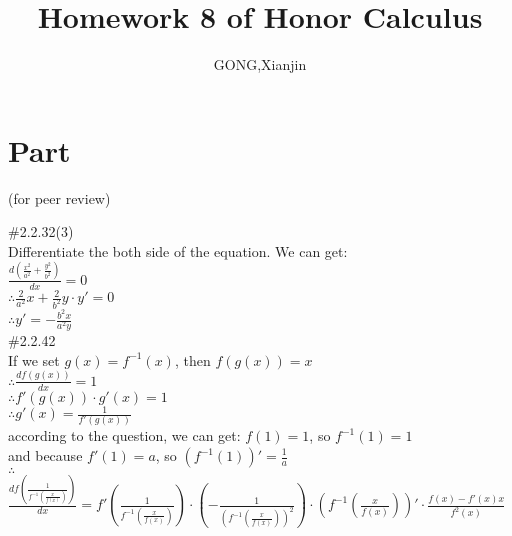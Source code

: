 \documentclass{article}
\author{GONG,Xianjin}
\title{Homework 8 of Honor Calculus}
\begin{document}
\maketitle

\section{\textcolor[rgb]{0.70,0.00,0.00}{Part \uppercase\expandafter{}}}(for peer review)

\vspace{3.5mm}

\textcolor[rgb]{0.00,0.00,0.50}{\#2.2.32(3)}\\

Differentiate the both side of the equation. We can get:\\

$\displaystyle\frac{d(\frac{x^2}{a^2}+\frac{y^2}{b^2})}{dx}=0$\\

$\therefore$\qquad$\displaystyle\frac{2}{a^2}x+\frac{2}{b^2}y\cdot y'=0$\\

$\therefore$\qquad$y'=-\frac{b^2x}{a^2y}$\\

\textcolor[rgb]{0.00,0.00,0.50}{\#2.2.42}\\

If we set $g(x)=f^{-1}(x)$, then $f(g(x))=x$\\

$\therefore$\qquad$\displaystyle\frac{df(g(x))}{dx}=1$\\

$\therefore$\qquad$f'(g(x))\cdot g'(x)=1$\\

$\therefore$\qquad$g'(x)=\displaystyle\frac{1}{f'(g(x))}$\\

according to the question, we can get: $f(1)=1$, so $f^{-1}(1)=1$\\

and because $f'(1)=a$, so $(f^{-1}(1))'=\displaystyle\frac{1}{a}$\\

$\therefore$\qquad$\displaystyle\frac{df\left(\frac{1}{f^{-1}\left(\frac{x}{f(x)}\right)}\right)}{dx}=f'\left(\frac{1}{f^{-1}\left(\frac{x}{f(x)}\right)}\right)\cdot\left(-\frac{1}{\left(f^{-1}\left(\frac{x}{f(x)}\right)\right)^2}\right)\cdot \left(f^{-1}\left(\frac{x}{f(x)}\right)\right)'\cdot\frac{f(x)-f'(x)x}{f^2(x)}$\\
\end{document}
